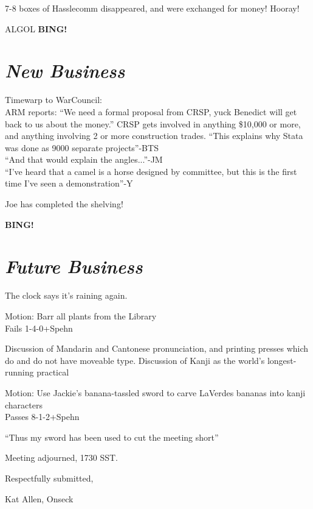 \documentclass[10pt]{article}
\newcommand{\bing}{{\bf BING!} }
\newcommand{\goto}[1]{\bing \vskip 12pt \section*{{\em{#1}}}}
\begin{document}
7-8 boxes of Hasslecomm disappeared, and were exchanged for money! Hooray!

ALGOL
\goto{New Business}

Timewarp to WarCouncil: \\
ARM reports: ``We need a formal proposal from CRSP, yuck Benedict will
get back to us about the money.''  CRSP gets involved in anything
\$10,000 or more, and anything involving 2 or more construction
trades.
``This explains why Stata was done as 9000 separate projects''-BTS\\
``And that would explain the angles...''-JM\\
``I've heard that a camel is a horse designed by committee, but this is the first time I've seen a demonstration''-Y

Joe has completed the shelving!

\goto{Future Business}
The clock says it's raining again.

Motion: Barr all plants from the Library\\
Fails 1-4-0+Spehn

Discussion of Mandarin and Cantonese pronunciation, and printing
presses which do and do not have moveable type.
Discussion of Kanji as the world's longest-running practical 

Motion: Use Jackie's banana-tassled sword to carve LaVerdes bananas
into kanji characters\\
 Passes 8-1-2+Spehn

``Thus my sword has been used to cut the meeting short''

\vspace{12pt}

\noindent
Meeting adjourned, 1730 SST.

\vspace{18pt}

\centerline{Respectfully submitted,}
\centerline{Kat Allen,  Onseck}
\end{document}
